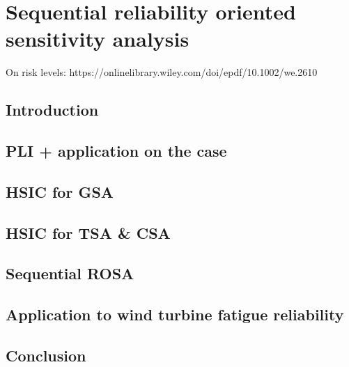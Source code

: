 \cleardoublepage
\chapter{Sequential reliability oriented sensitivity analysis}
\label{chpt:7}
\hfill
\localtableofcontents
\newpage

On risk levels: https://onlinelibrary.wiley.com/doi/epdf/10.1002/we.2610

\section{Introduction}
\section{PLI + application on the case}
\section{HSIC for GSA}
\section{HSIC for TSA \& CSA}
\section{Sequential ROSA}
\section{Application to wind turbine fatigue reliability}
\section{Conclusion}